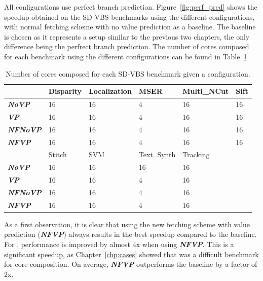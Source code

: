 All configurations use perfect branch prediction.
Figure~\ref{fig:perf_pred} shows the speedup obtained on the SD-VBS benchmarks using the different configurations, with normal fetching scheme with no value prediction as a baseline.
The baseline is chosen as it represents a setup similar to the previous two chapters, the only difference being the perfrect branch prediction.
The number of cores composed for each benchmark using the different configurations can be found in Table~\ref{tab:conf_cores}.

\begin{table}[t]
  \small
  \centering
 \begin{tabular} {| l | l | l | l | l | l | }
 \hline
    & \cellcolor[gray]{0.7}Disparity & \cellcolor[gray]{0.7} Localization& \cellcolor[gray]{0.7} MSER& \cellcolor[gray]{0.7} Multi\_NCut& \cellcolor[gray]{0.7} Sift\\ \hline
 \textbf{\textit{NoVP}}   & 16  & 16 & 4  & 16& 16\\ \hline
 \textbf{\textit{VP}}   & 16  & 16 & 4  & 16& 16\\ \hline
 \textbf{\textit{NFNoVP}}   & 16  & 16 & 4  & 16& 16\\ \hline
 \textbf{\textit{NFVP}}   & 16  & 16 & 4  & 16& 16\\ \hline
	  & \cellcolor[gray]{0.7} Stitch & \cellcolor[gray]{0.7} SVM & \cellcolor[gray]{0.7} Text. Synth & \cellcolor[gray]{0.7} Tracking&\\ \hline
\textbf{\textit{NoVP}}	 & 16& 16& 16& 16 &\\ \hline
   \textbf{\textit{VP}} & 16  & 16 & 4  & 16 & \\ \hline
 \textbf{\textit{NFNoVP}}  & 16  & 16 & 4  & 16 & \\ \hline
 \textbf{\textit{NFVP}}   & 16  & 16 & 4  & 16 &\\ \hline

	\end{tabular}
  \caption{Number of cores composed for each SD-VBS benchmark given a configuration.}\label{tab:conf_cores}
  \vspace{2em}
\end{table}

As a first observation, it is clear that using the new fetching scheme with value prediction (\textit{\textbf{NFVP}}) always results in the best speedup compared to the baseline.
For , performance is improved by almost 4x when using \textit{\textbf{NFVP}}.
This is a significant speedup, as Chapter~\ref{chp:cases} showed that  was a difficult benchmark for core composition.
On average, \textit{\textbf{NFVP}} outperforms the baseline by a factor of 2x.

